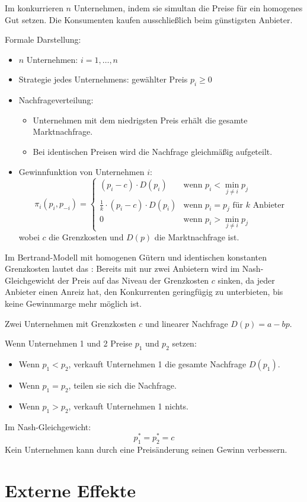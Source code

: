\begin{definition}
Im  konkurrieren $n$ Unternehmen, indem sie simultan die Preise für ein homogenes Gut setzen. Die Konsumenten kaufen ausschließlich beim günstigsten Anbieter.

Formale Darstellung:
\begin{itemize}
    \item $n$ Unternehmen: $i = 1, \dots, n$
    \item Strategie jedes Unternehmens: gewählter Preis $p_i \geq 0$
    \item Nachfrageverteilung:
    \begin{itemize}
        \item Unternehmen mit dem niedrigsten Preis erhält die gesamte Marktnachfrage.
        \item Bei identischen Preisen wird die Nachfrage gleichmäßig aufgeteilt.
    \end{itemize}
    \item Gewinnfunktion von Unternehmen $i$:
    \[
    \pi_i(p_i, p_{-i}) =
    \begin{cases}
        (p_i - c) \cdot D(p_i) & \text{wenn } p_i < \min\limits_{j \neq i} p_j \\
        \frac{1}{k} \cdot (p_i - c) \cdot D(p_i) & \text{wenn } p_i = p_j \text{ für } k \text{ Anbieter} \\
        0 & \text{wenn } p_i > \min\limits_{j \neq i} p_j
    \end{cases}
    \]
    wobei $c$ die Grenzkosten und $D(p)$ die Marktnachfrage ist.
\end{itemize}
\end{definition}

\noindent
Im Bertrand-Modell mit homogenen Gütern und identischen konstanten Grenzkosten lautet das :
Bereits mit nur zwei Anbietern wird im Nash-Gleichgewicht der Preis auf das Niveau der Grenzkosten $c$ sinken, da jeder Anbieter einen Anreiz hat, den Konkurrenten geringfügig zu unterbieten, bis keine Gewinnmarge mehr möglich ist.

\begin{example}
Zwei Unternehmen mit Grenzkosten $c$ und linearer Nachfrage $D(p) = a - b p$.

Wenn Unternehmen 1 und 2 Preise $p_1$ und $p_2$ setzen:
\begin{itemize}
    \item Wenn $p_1 < p_2$, verkauft Unternehmen 1 die gesamte Nachfrage $D(p_1)$.
    \item Wenn $p_1 = p_2$, teilen sie sich die Nachfrage.
    \item Wenn $p_1 > p_2$, verkauft Unternehmen 1 nichts.
\end{itemize}

Im Nash-Gleichgewicht:
\[
p_1^* = p_2^* = c
\]
Kein Unternehmen kann durch eine Preisänderung seinen Gewinn verbessern.
\end{example}




\section{Externe Effekte}






